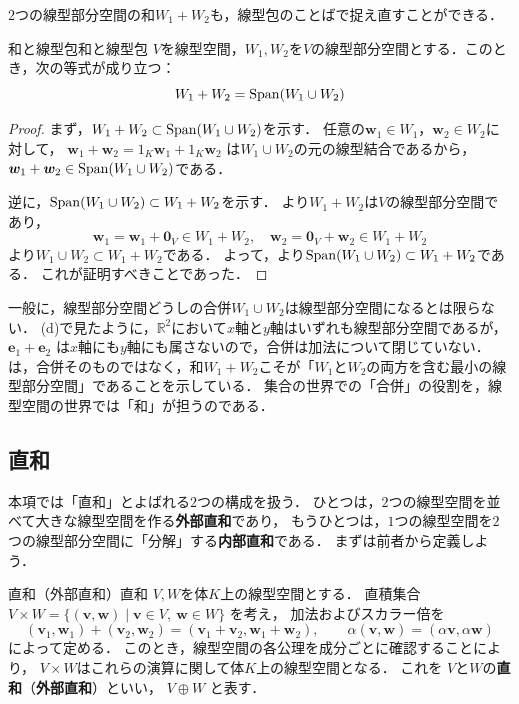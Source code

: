 $2$つの線型部分空間の和$W_1+W_2$も，線型包のことばで捉え直すことができる．

\begin{prop}{和と線型包}{和と線型包}
  $V$を線型空間，$W_1, W_2$を$V$の線型部分空間とする．このとき，次の等式が成り立つ：
  \[
    W_1 + W_2 = \operatorname{Span}(W_1 \cup W_2)
  \]
\end{prop}

\begin{tleftbar}
\begin{proof}
  まず，$W_1 + W_2 \subset \operatorname{Span}(W_1 \cup W_2)$を示す．
  任意の$\bm{w}_1 \in W_1$，$\bm{w}_2 \in W_2$に対して，
  $\bm{w}_1 + \bm{w}_2 = 1_K \bm{w}_1 + 1_K \bm{w}_2$
  は$W_1 \cup W_2$の元の線型結合であるから，$\bm{w}_1 + \bm{w}_2 \in \operatorname{Span}(W_1 \cup W_2)$である．

  逆に，$\operatorname{Span}(W_1 \cup W_2) \subset W_1 + W_2$を示す．
  より$W_1 + W_2$は$V$の線型部分空間であり，
  \[
    \bm{w}_1 = \bm{w}_1 + \bm{0}_V \in W_1 + W_2,
    \quad
    \bm{w}_2 = \bm{0}_V + \bm{w}_2 \in W_1 + W_2
  \]
  より$W_1 \cup W_2 \subset W_1 + W_2$である．
  よって，より$\operatorname{Span}(W_1 \cup W_2) \subset W_1 + W_2$である．
  これが証明すべきことであった．
\end{proof}
\end{tleftbar}

\begin{remark}[合併は線型部分空間とは限らない]
一般に，線型部分空間どうしの合併$W_1 \cup W_2$は線型部分空間になるとは限らない．
(d)で見たように，$\mathbb{R}^2$において$x$軸と$y$軸はいずれも線型部分空間であるが，
$\bm{e}_1 + \bm{e}_2$
は$x$軸にも$y$軸にも属さないので，合併は加法について閉じていない．
は，合併そのものではなく，和$W_1 + W_2$こそが「$W_1$と$W_2$の両方を含む最小の線型部分空間」であることを示している．
集合の世界での「合併」の役割を，線型空間の世界では「和」が担うのである．
\end{remark}

\subsection{直和}

本項では「直和」とよばれる$2$つの構成を扱う．
ひとつは，$2$つの線型空間を並べて大きな線型空間を作る\textbf{外部直和}であり，
もうひとつは，$1$つの線型空間を$2$つの線型部分空間に「分解」する\textbf{内部直和}である．
まずは前者から定義しよう．

\begin{definition}{直和（外部直和）}{直和}
  $V,W$を体$K$上の線型空間とする．
  直積集合
  $V\times W
  =
  \{
  (\bm{v},\bm{w})
  \mid
  \bm{v}\in V,\
  \bm{w}\in W
  \}$
  を考え，
  加法およびスカラー倍を
  \[
  (\bm{v}_1,\bm{w}_1)+(\bm{v}_2,\bm{w}_2)
  =
  (\bm{v}_1+\bm{v}_2,\bm{w}_1+\bm{w}_2),
  \qquad
  \alpha(\bm{v},\bm{w})
  =
  (\alpha \bm{v},\alpha \bm{w})
  \]
  によって定める．
  このとき，線型空間の各公理を成分ごとに確認することにより，
  $V\times W$はこれらの演算に関して体$K$上の線型空間となる．
  これを
  $V$と$W$の\textbf{直和}（\textbf{外部直和}）といい，
  $V\oplus W$
  と表す．
\end{definition}


